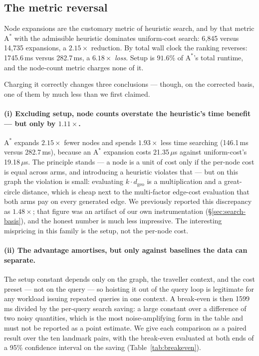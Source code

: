 \documentclass[11pt]{article}
\newcommand{\dgeo}{d_{\mathrm{geo}}}
\begin{document}
\subsection{The metric reversal}

Node expansions are the customary metric of heuristic search, and by that metric
$\mathrm{A}^*$ with the admissible heuristic dominates uniform-cost search: 6,845 versus
14,735 expansions, a $2.15\times$ reduction. By total wall clock the ranking reverses:
1745.6\,ms versus 282.7\,ms, a $6.18\times$ \emph{loss}. Setup is $91.6\%$ of
$\mathrm{A}^*$'s total runtime, and the node-count metric charges none of it.

Charging it correctly changes three conclusions --- though, on the corrected basis, one of them by
much less than we first claimed.

\paragraph{(i) Excluding setup, node counts overstate the heuristic's time benefit --- but only by
$1.11\times$.} $\mathrm{A}^*$ expands $2.15\times$ fewer nodes and spends $1.93\times$ less time
searching (146.1\,ms versus 282.7\,ms), because an $\mathrm{A}^*$ expansion costs
21.35\,$\mu$s against uniform-cost's 19.18\,$\mu$s. The principle stands --- a node is a unit of
cost only if the per-node cost is equal across arms, and introducing a heuristic violates that ---
but on this graph the violation is small: evaluating $k \cdot \dgeo$ is a multiplication and a
great-circle distance, which is cheap next to the multi-factor edge-cost evaluation that both arms
pay on every generated edge. We previously reported this discrepancy as $1.48\times$; that figure
was an artifact of our own instrumentation (\S\ref{sec:search-basis}), and the honest number is
much less impressive. The interesting mispricing in this family is the setup, not the per-node
cost.

\paragraph{(ii) The advantage amortises, but only against baselines the data can separate.} The
setup constant depends only on the graph, the traveller context, and the cost preset --- not on the
query --- so hoisting it out of the query loop is legitimate for any workload issuing repeated
queries in one context. A break-even is then 1599\,ms divided by the per-query search saving: a
large constant over a difference of two noisy quantities, which is the most noise-amplifying form
in the table and must not be reported as a point estimate. We give each comparison as a paired
result over the ten landmark pairs, with the break-even evaluated at both ends of a 95\% confidence
interval on the saving (Table~\ref{tab:breakeven}).
\end{document}
